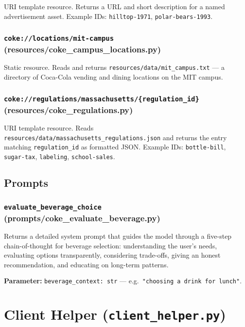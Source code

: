 \documentclass[11pt, a4paper]{article}
\begin{document}
URI template resource. Returns a URL and short description for a named advertisement asset. Example IDs: \texttt{hilltop-1971}, \texttt{polar-bears-1993}.

\subsubsection{\texttt{coke://locations/mit-campus} (resources/coke\_campus\_locations.py)}

Static resource. Reads and returns \texttt{resources/data/mit\_campus.txt} — a directory of Coca-Cola vending and dining locations on the MIT campus.

\subsubsection{\texttt{coke://regulations/massachusetts/\{regulation\_id\}} (resources/coke\_regulations.py)}

URI template resource. Reads \texttt{resources/data/massachusetts\_regulations.json} and returns the entry matching \texttt{regulation\_id} as formatted JSON. Example IDs: \texttt{bottle-bill}, \texttt{sugar-tax}, \texttt{labeling}, \texttt{school-sales}.

\subsection{Prompts}

\subsubsection{\texttt{evaluate\_beverage\_choice} (prompts/coke\_evaluate\_beverage.py)}

Returns a detailed system prompt that guides the model through a five-step chain-of-thought for beverage selection: understanding the user's needs, evaluating options transparently, considering trade-offs, giving an honest recommendation, and educating on long-term patterns.

\textbf{Parameter:} \texttt{beverage\_context: str} — e.g.\ \texttt{"choosing a drink for lunch"}.

\appendix

\section{Client Helper (\texttt{client\_helper.py})}
\label{appendix:client_helper}
\end{document}
